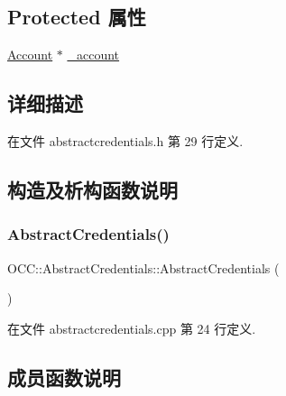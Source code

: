 \subsection*{Protected 属性}
\begin{DoxyCompactItemize}
\item 
\hyperlink{class_o_c_c_1_1_account}{Account} $\ast$ \hyperlink{class_o_c_c_1_1_abstract_credentials_a40dc661c4b0f5852af9e29464ef164d1}{\+\_\+account}
\end{DoxyCompactItemize}


\subsection{详细描述}


在文件 abstractcredentials.\+h 第 29 行定义.



\subsection{构造及析构函数说明}
\mbox{\label{class_o_c_c_1_1_abstract_credentials_aad7f0ecc6a9f1335be4abc5754321baf}} 
\subsubsection{\texorpdfstring{Abstract\+Credentials()}{AbstractCredentials()}}
{\footnotesize\ttfamily O\+C\+C\+::\+Abstract\+Credentials\+::\+Abstract\+Credentials (\begin{DoxyParamCaption}{ }\end{DoxyParamCaption})}



在文件 abstractcredentials.\+cpp 第 24 行定义.



\subsection{成员函数说明}
\mbox{\label{class_o_c_c_1_1_abstract_credentials_a0ea872247ddb71564cc0ea2209e58763}} 
